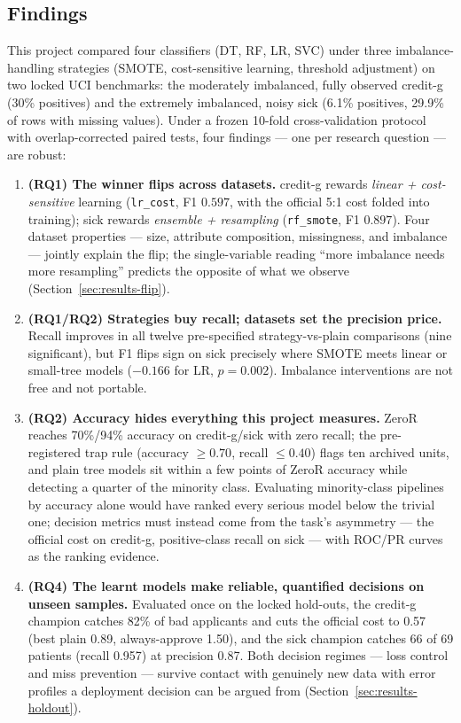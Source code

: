 \subsection{Findings}

This project compared four classifiers (DT, RF, LR, SVC) under three imbalance-handling strategies (SMOTE, cost-sensitive learning, threshold adjustment) on two locked UCI benchmarks: the moderately imbalanced, fully observed credit-g (30\% positives) and the extremely imbalanced, noisy sick (6.1\% positives, 29.9\% of rows with missing values). Under a frozen 10-fold cross-validation protocol with overlap-corrected paired tests, four findings --- one per research question --- are robust:

\begin{enumerate}
  \item \textbf{(RQ1) The winner flips across datasets.} credit-g rewards \emph{linear + cost-sensitive} learning (\texttt{lr\_cost}, F1 $0.597$, with the official 5:1 cost folded into training); sick rewards \emph{ensemble + resampling} (\texttt{rf\_smote}, F1 $0.897$). Four dataset properties --- size, attribute composition, missingness, and imbalance --- jointly explain the flip; the single-variable reading ``more imbalance needs more resampling'' predicts the opposite of what we observe (Section~\ref{sec:results-flip}).
  \item \textbf{(RQ1/RQ2) Strategies buy recall; datasets set the precision price.} Recall improves in all twelve pre-specified strategy-vs-plain comparisons (nine significant), but F1 flips sign on sick precisely where SMOTE meets linear or small-tree models ($-0.166$ for LR, $p=0.002$). Imbalance interventions are not free and not portable.
  \item \textbf{(RQ2) Accuracy hides everything this project measures.} ZeroR reaches 70\%/94\% accuracy on credit-g/sick with zero recall; the pre-registered trap rule (accuracy $\geq 0.70$, recall $\leq 0.40$) flags ten archived units, and plain tree models sit within a few points of ZeroR accuracy while detecting a quarter of the minority class. Evaluating minority-class pipelines by accuracy alone would have ranked every serious model below the trivial one; decision metrics must instead come from the task's asymmetry --- the official cost on credit-g, positive-class recall on sick --- with ROC/PR curves as the ranking evidence.
  \item \textbf{(RQ4) The learnt models make reliable, quantified decisions on unseen samples.} Evaluated once on the locked hold-outs, the credit-g champion catches 82\% of bad applicants and cuts the official cost to 0.57 (best plain 0.89, always-approve 1.50), and the sick champion catches 66 of 69 patients (recall 0.957) at precision 0.87. Both decision regimes --- loss control and miss prevention --- survive contact with genuinely new data with error profiles a deployment decision can be argued from (Section~\ref{sec:results-holdout}).
\end{enumerate}

